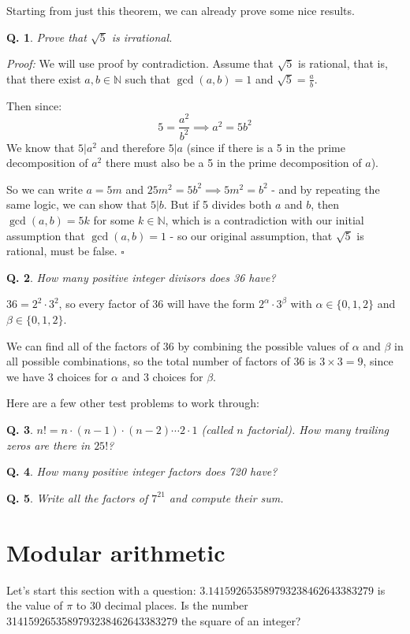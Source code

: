 \documentclass{article}
\newtheorem{question}{Q.}
\begin{document}
Starting from just this theorem, we can already prove some nice results.

\begin{question}Prove that $\sqrt{5}$ is irrational.\end{question}

\emph{Proof:} We will use proof by contradiction. Assume that $\sqrt{5}$ is rational,
that is, that there exist $a,b\in \mathbb{N}$ such that $\gcd(a,b)=1$ and 
$\sqrt{5}=\frac{a}{b}$.

Then since:
\[ 5 = \frac{a^2}{b^2} \implies a^2=5b^2 \]
We know that $5 | a^2$ and therefore $5|a$ (since if there is a 5 in the prime
decomposition of $a^2$ there must also be a 5 in the prime decomposition of $a$).

So we can write $a=5m$ and $25m^2 = 5b^2 \implies 5m^2 = b^2$ - and by repeating the
same logic, we can show that $5 | b$. But if 5 divides both $a$ and $b$, then
$\gcd(a,b) = 5k$ for some $k \in \mathbb{N}$, which is a contradiction with our
initial assumption that $\gcd(a,b)=1$ - so our original assumption, that $\sqrt{5}$
is rational, must be false. 
$\square$

\begin{question}How many positive integer divisors does 36 have?\end{question}

$36 = 2^2 \cdot 3^2$, so every factor of 36 will have the form 
$2^{\alpha}\cdot 3^{\beta}$ with $\alpha \in \{0,1,2\}$ and $\beta \in \{0,1,2\}$.

We can find all of the factors of 36 by combining the possible values of $\alpha$
and $\beta$ in all possible combinations, so the total number of factors of 36 is 
$3 \times 3 = 9$, since we have 3 choices for $\alpha$ and 3 choices for $\beta$.

Here are a few other test problems to work through:

\begin{question} $n! = n\cdot (n-1)\cdot (n-2) \cdots 2 \cdot 1$ (called $n$
factorial). How many trailing zeros are there in $25!$?\end{question}
\begin{question}How many positive integer factors does 720 have?\end{question}
\begin{question}Write all the factors of $7^21$ and compute their sum.\end{question}

\section{Modular arithmetic}

Let's start this section with a question: $3.141592653589793238462643383279$ is the
value of $\pi$ to 30 decimal places. Is the number 3141592653589793238462643383279
the square of an integer?
\end{document}
